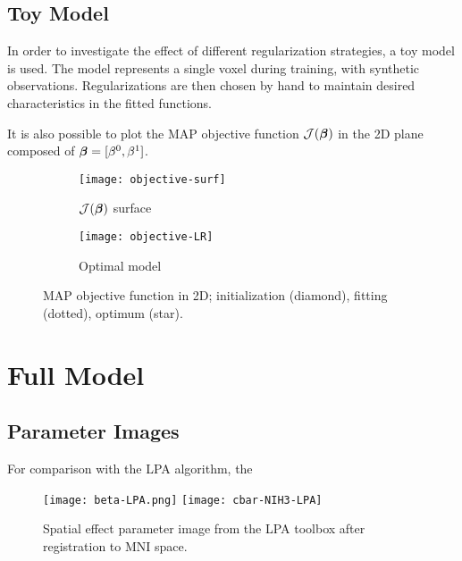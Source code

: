 \subsection{Toy Model}\label{ss:toyreg}
In order to investigate the effect of different regularization strategies, a toy model is used. The model represents a single voxel during training, with synthetic observations. Regularizations are then chosen by hand to maintain desired characteristics in the fitted functions. 

\par
It is also possible to plot the MAP objective function $\mathcal{J}(\bm{\beta})$ in the 2D plane composed of $\bm{\beta} = [\beta^0,\beta^1]$.
\begin{figure}
  \centering
  \begin{subfigure}{\plotwidth}\centering\texttt{[image: objective-surf]}\caption{$\mathcal{J}(\bm{\beta})$ surface}\label{fig:obj-surf}\end{subfigure}
  \begin{subfigure}{\plotwidth}\centering\texttt{[image: objective-LR]}  \caption{Optimal model}\label{fig:obj-lr}\end{subfigure}
  \caption{MAP objective function in 2D; initialization (diamond), fitting (dotted), optimum (star).}
\end{figure}

\section{Full Model}
\subsection{Parameter Images}\label{ss:paramimg}

For comparison with the LPA algorithm, the
\begin{figure}
  \centering\texttt{[image: beta-LPA.png]} \texttt{[image: cbar-NIH3-LPA]}
  \caption{Spatial effect parameter image from the LPA toolbox after registration to MNI space.}
  \label{fig:B-lpa}
\end{figure}

